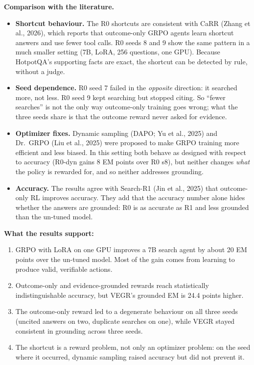 \textbf{Comparison with the literature.}

\begin{itemize}
\tightlist
\item
  \textbf{Shortcut behaviour.} The R0 shortcuts are consistent with CaRR
  (Zhang et al., 2026), which reports that outcome-only GRPO agents
  learn shortcut answers and use fewer tool calls. R0 seeds 8 and 9 show
  the same pattern in a much smaller setting (7B, LoRA, 256 questions,
  one GPU). Because HotpotQA's supporting facts are exact, the shortcut
  can be detected by rule, without a judge.
\item
  \textbf{Seed dependence.} R0 seed 7 failed in the \emph{opposite}
  direction: it searched more, not less. R0 seed 9 kept searching but
  stopped citing. So ``fewer searches'' is not the only way outcome-only
  training goes wrong; what the three seeds share is that the outcome
  reward never asked for evidence.
\item
  \textbf{Optimizer fixes.} Dynamic sampling (DAPO; Yu et al., 2025) and
  Dr.~GRPO (Liu et al., 2025) were proposed to make GRPO training more
  efficient and less biased. In this setting both behave as designed
  with respect to accuracy (R0-dyn gains 8 EM points over R0 s8), but
  neither changes \emph{what} the policy is rewarded for, and so neither
  addresses grounding.
\item
  \textbf{Accuracy.} The results agree with Search-R1 (Jin et al., 2025)
  that outcome-only RL improves accuracy. They add that the accuracy
  number alone hides whether the answers are grounded: R0 is as accurate
  as R1 and less grounded than the un-tuned model.
\end{itemize}

\textbf{What the results support:}

\begin{enumerate}
\def\labelenumi{\arabic{enumi}.}
\tightlist
\item
  GRPO with LoRA on one GPU improves a 7B search agent by about 20 EM
  points over the un-tuned model. Most of the gain comes from learning
  to produce valid, verifiable actions.
\item
  Outcome-only and evidence-grounded rewards reach statistically
  indistinguishable accuracy, but VEGR's grounded EM is 24.4 points
  higher.
\item
  The outcome-only reward led to a degenerate behaviour on all three
  seeds (uncited answers on two, duplicate searches on one), while VEGR
  stayed consistent in grounding across three seeds.
\item
  The shortcut is a reward problem, not only an optimizer problem: on
  the seed where it occurred, dynamic sampling raised accuracy but did
  not prevent it.
\end{enumerate}

